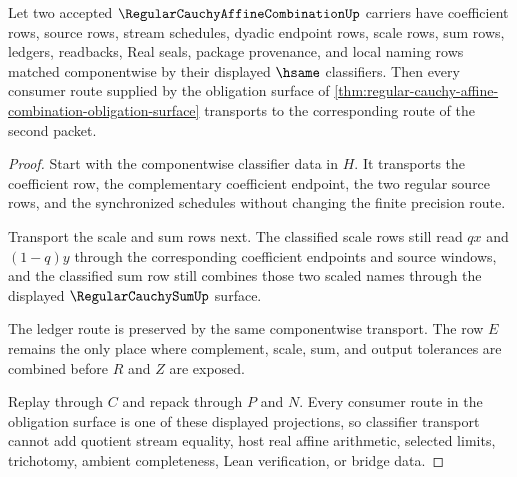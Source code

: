 \begin{theorem}
\label{thm:regular-cauchy-affine-combination-stability}
Let two accepted $\RegularCauchyAffineCombinationUp$ carriers have coefficient rows, source rows, stream schedules, dyadic endpoint rows, scale rows, sum rows, ledgers, readbacks, Real seals, package provenance, and local naming rows matched componentwise by their displayed $\hsame$ classifiers. Then every consumer route supplied by the obligation surface of \autoref{thm:regular-cauchy-affine-combination-obligation-surface} transports to the corresponding route of the second packet.
\end{theorem}
\begin{proof}
Start with the componentwise classifier data in $H$. It transports the coefficient row, the complementary coefficient endpoint, the two regular source rows, and the synchronized schedules without changing the finite precision route.

Transport the scale and sum rows next. The classified scale rows still read $q x$ and $(1-q)y$ through the corresponding coefficient endpoints and source windows, and the classified sum row still combines those two scaled names through the displayed $\RegularCauchySumUp$ surface.

The ledger route is preserved by the same componentwise transport. The row $E$ remains the only place where complement, scale, sum, and output tolerances are combined before $R$ and $Z$ are exposed.

Replay through $C$ and repack through $P$ and $N$. Every consumer route in the obligation surface is one of these displayed projections, so classifier transport cannot add quotient stream equality, host real affine arithmetic, selected limits, trichotomy, ambient completeness, Lean verification, or bridge data.
\end{proof}

